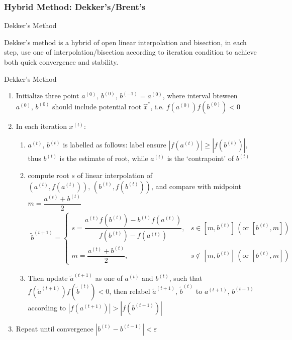     


\subsubsection{Hybrid Method: Dekker's/Brent's}
\hypertarget{HybridMethod}{}

\begin{point}
    \hypertarget{Dekker}{Dekker's Method}
\end{point}

    Dekker's method is a hybrid of open linear interpolation and bisection, in each step, use one of interpolation/bisection according to iteration condition to achieve both quick convergence and stability.
\begin{algorithm}{Dekker's Method}

\begin{enumerate}[topsep=2pt,itemsep=2pt]
    \item Initialize three point $ a^{(0)},\,b^{(0)},\, b^{(-1)}=a^{(0)} $, where interval bteween $a^{(0)},\,b^{(0)} $ should include potential root $ \hat{x}^{*} $, i.e. $ f(a^{(0)})f(b^{(0)})<0 $
    \item In each iteration $ x^{(t)} $:
    \begin{enumerate}[topsep=2pt,itemsep=2pt]
        \item $ a^{(t)},\,b^{(t)} $ is labelled as follows: label ensure $ |f(a^{(t)})|\geq |f(b^{(t)})| $, thus $ b^{(t)} $ is the estimate of root, while $ a^{(t)} $ is the `contrapoint' of $ b^{(t)} $
        \item compute root $ s $ of linear interpolation of $ (a^{(t)},f(a^{(t)})), \, (b^{(t)},f(b^{(t)})) $, and compare with midpoint $ m=\dfrac{a^{(t)}+b^{(t)}}{2} $
        \begin{align}
            \tilde{b}^{(t+1)}= 
            \begin{cases}
                s=\dfrac{a^{(t)}f(b^{(t)})-b^{(t)}f(a^{(t)})}{f(b^{(t)})-f(a^{(t)})},&s\in [m,b^{(t)}]\,(\text{or }[b^{(t)},m])\\
                m=\dfrac{a^{(t)}+b^{(t)}}{2},&s\notin [m,b^{(t)}]\,(\text{or }[b^{(t)},m])
            \end{cases}
        \end{align}
        \item Then update $ \tilde{a}^{(t+1)} $ as one of $ a^{(t)} $ and $ b^{(t)} $, such that $ f(\tilde{a}^{(t+1)})f(\tilde{b}^{(t)})<0 $, then relabel $ \tilde{a}^{(t+1)} $, $ \tilde{b}^{(t)} $ to $ a^{(t+1)} $, $ b^{(t+1)} $ according to $ |f(a^{(t+1)})|>|f(b^{(t+1)})| $
    \end{enumerate}
    \item Repeat until convergence $ |b^{(t)}-b^{(t-1)}|<\varepsilon  $
\end{enumerate}

    
\end{algorithm}
    

